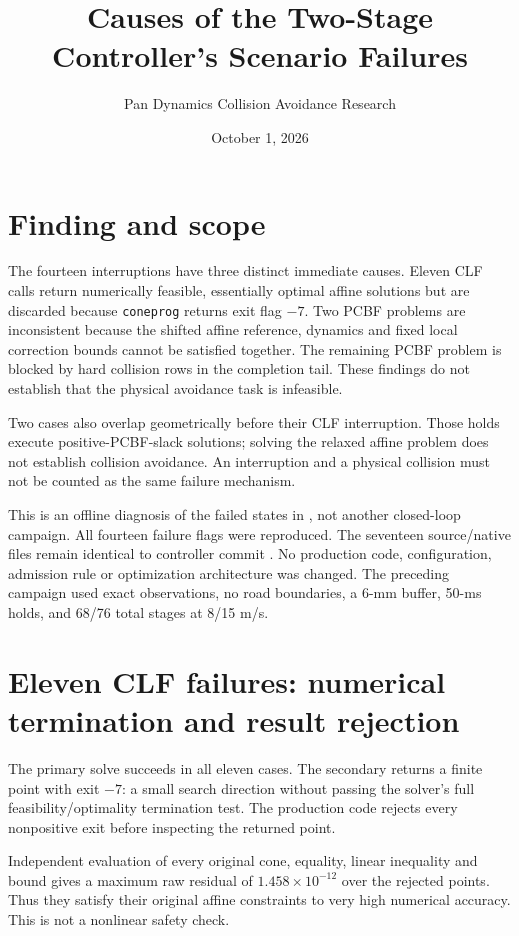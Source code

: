 \documentclass[11pt]{article}
\title{Causes of the Two-Stage Controller's Scenario Failures}
\author{Pan Dynamics Collision Avoidance Research}
\date{October 1, 2026}
\begin{document}
\maketitle

\section{Finding and scope}
The fourteen interruptions have three distinct immediate causes. Eleven CLF
calls return numerically feasible, essentially optimal affine solutions but
are discarded because \texttt{coneprog} returns exit flag $-7$. Two PCBF
problems are inconsistent because the shifted affine reference, dynamics and
fixed local correction bounds cannot be satisfied together. The remaining
PCBF problem is blocked by hard collision rows in the completion tail.
These findings do not establish that the physical avoidance task is infeasible.

Two cases also overlap geometrically before their CLF interruption. Those
holds execute positive-PCBF-slack solutions; solving the relaxed affine
problem does not establish collision avoidance. An interruption and a physical
collision must not be counted as the same failure mechanism.

This is an offline diagnosis of the failed states in
, not another closed-loop campaign.
All fourteen failure flags were reproduced. The seventeen source/native files
remain identical to controller commit
. No production code,
configuration, admission rule or optimization architecture was changed.
The preceding campaign used exact observations, no road boundaries, a 6-mm
buffer, 50-ms holds, and 68/76 total stages at 8/15 m/s.

\section{Eleven CLF failures: numerical termination and result rejection}
The primary solve succeeds in all eleven cases. The secondary returns a
finite point with exit $-7$: a small search direction without passing the
solver's full feasibility/optimality termination test. The production code
rejects every nonpositive exit before inspecting the returned point.

Independent evaluation of every original cone, equality, linear inequality
and bound gives a maximum raw residual of $1.458\times10^{-12}$ over the
rejected points. Thus they satisfy their original affine constraints to very
high numerical accuracy. This is not a nonlinear safety check.
\end{document}
